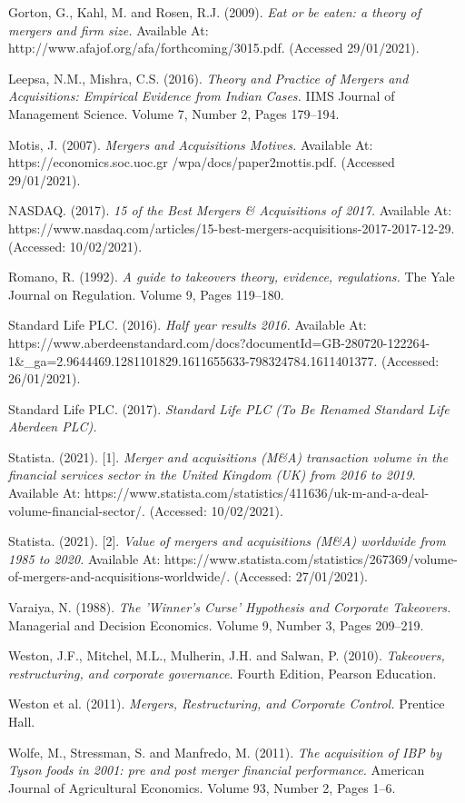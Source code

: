 \documentclass[11pt, english]{article}
\begin{document}
\begin{thebibliography}{9}
        	Gorton, G., Kahl, M. and Rosen, R.J. (2009).
		\textsl{Eat or be eaten: a theory of mergers and firm size.}
		Available At: http://www.afajof.org/afa/forthcoming/3015.pdf. (Accessed 29/01/2021).

		Leepsa, N.M., Mishra, C.S. (2016).
		\textsl{Theory and Practice of Mergers and Acquisitions: Empirical Evidence from Indian Cases.}
		IIMS Journal of Management Science. Volume 7, Number 2, Pages 179--194.

		Motis, J. (2007).
		\textsl{Mergers and Acquisitions Motives.}
		Available At: https://economics.soc.uoc.gr /wpa/docs/paper2mottis.pdf. (Accessed 29/01/2021).

        	NASDAQ. (2017).
		\textsl{15 of the Best Mergers \& Acquisitions of 2017.}
		Available At: https://www.nasdaq.com/articles/15-best-mergers-acquisitions-2017-2017-12-29. (Accessed: 10/02/2021).

		Romano, R. (1992).
		\textsl{A guide to takeovers theory, evidence, regulations.}
		The Yale Journal on Regulation. Volume 9, Pages 119--180.

        	Standard Life PLC. (2016).
		\textsl{Half year results 2016.}
		Available At: https://www.aberdeenstandard.com/docs?documentId=GB-280720-122264-1\&\_ga=2.9644469.1281101829.1611655633-798324784.1611401377. (Accessed: 26/01/2021).

        	Standard Life PLC. (2017).
		\textsl{Standard Life PLC (To Be Renamed Standard Life Aberdeen PLC).}

        	Statista. (2021). [1].
		\textsl{Merger and acquisitions (M\&A) transaction volume in the financial services sector in the United Kingdom (UK) from 2016 to 2019.}
		Available At: https://www.statista.com/statistics/411636/uk-m-and-a-deal-volume-financial-sector/. (Accessed: 10/02/2021).

        	Statista. (2021). [2].
		\textsl{Value of mergers and acquisitions (M\&A) worldwide from 1985 to 2020.}
		Available At: https://www.statista.com/statistics/267369/volume-of-mergers-and-acquisitions-worldwide/. (Accessed: 27/01/2021).

        	Varaiya, N. (1988).
		\textsl{The 'Winner's Curse' Hypothesis and Corporate Takeovers.}
		Managerial and Decision Economics. Volume 9, Number 3, Pages 209--219.

        	Weston, J.F., Mitchel, M.L., Mulherin, J.H. and Salwan, P. (2010).
		\textsl{Takeovers, restructuring, and corporate governance.}
		Fourth Edition, Pearson Education.

        	Weston et al. (2011).
		\textsl{Mergers, Restructuring, and Corporate Control.}
		Prentice Hall.

		Wolfe, M., Stressman, S. and Manfredo, M. (2011).
		\textsl{The acquisition of IBP by Tyson foods in 2001: pre and post merger financial performance.}
		American Journal of Agricultural Economics. Volume 93, Number 2, Pages 1--6.

\end{thebibliography}
\end{document}

